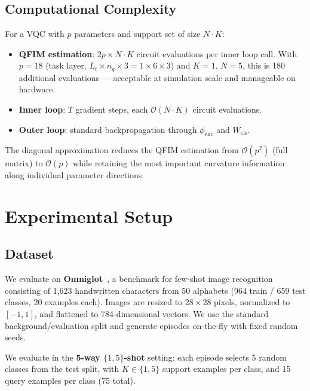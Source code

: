 \documentclass[a4paper,nopdfoutputerror]{quantumarticle}
\begin{document}
\subsection{Computational Complexity}

For a VQC with $p$ parameters and support set of size $N \cdot K$:
\begin{itemize}
  \item \textbf{QFIM estimation}: $2p \times N \cdot K$ circuit evaluations
        per inner loop call. With $p = 18$ (task layer,
        $L_t \times n_q \times 3 = 1 \times 6 \times 3$) and $K=1$, $N=5$,
        this is 180 additional evaluations — acceptable at simulation scale
        and manageable on hardware.
  \item \textbf{Inner loop}: $T$ gradient steps, each $\mathcal{O}(N \cdot K)$
        circuit evaluations.
  \item \textbf{Outer loop}: standard backpropagation through
        $\phi_{\mathrm{enc}}$ and $W_{\mathrm{cls}}$.
\end{itemize}

The diagonal approximation reduces the QFIM estimation from
$\mathcal{O}(p^2)$ (full matrix) to $\mathcal{O}(p)$ while retaining
the most important curvature information along individual parameter directions.

\section{Experimental Setup}
\label{sec:experiments}

\subsection{Dataset}

We evaluate on \textbf{Omniglot}~\cite{lake2015human}, a benchmark for
few-shot image recognition consisting of 1,623 handwritten characters from
50 alphabets (964 train / 659 test classes, 20 examples each).
Images are resized to $28 \times 28$ pixels, normalized to $[-1, 1]$, and
flattened to 784-dimensional vectors.
We use the standard background/evaluation split and generate episodes
on-the-fly with fixed random seeds.

We evaluate in the \textbf{5-way $\{1, 5\}$-shot} setting:
each episode selects 5 random classes from the test split, with $K \in \{1, 5\}$
support examples per class, and 15 query examples per class (75 total).
\end{document}

